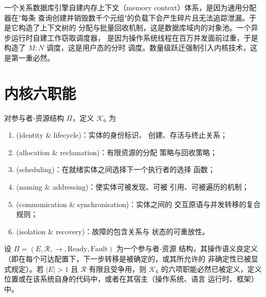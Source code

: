 \begin{example}\label{ex:pg-memctx}
一个关系数据库引擎自建内存上下文（memory context）体系，是因为通用分配器在"每条
查询创建并销毁数千个元组"的负载下会产生碎片且无法追踪泄漏。于是它构造了上下文树的
分配与批量回收机制，这是数据库域内的对象池。一个异步运行时自建工作窃取调度器，
是因为操作系统线程在百万并发面前过重，于是构造了 $M{:}N$ 调度，这是用户态的分时
调度。数量级跃迁强制引入内核技术，这是第一重必然。
\end{example}

\section{内核六职能}\label{sec:six}

\begin{definition}[内核六职能]\label{def:six}
对参与者-资源结构 $\Pi$，定义 $\mathcal{K}_6$ 为
\begin{enumerate}[label=(F\arabic*)]
\item {} \textnormal{(identity \& lifecycle)}：实体的身份标识、
      创建、存活与终止关系；
\item {} \textnormal{(allocation \& reclamation)}：有限资源的分配
      策略与回收策略；
\item {} \textnormal{(scheduling)}：在就绪实体之间选择下一个执行者的选择
      函数；
\item {} \textnormal{(naming \& addressing)}：使实体可被发现、可被
      引用、可被遍历的机制；
\item {} \textnormal{(communication \& synchronisation)}：实体之间的
      交互原语与并发转移的复合规则；
\item {} \textnormal{(isolation \& recovery)}：故障的包含关系与
      状态的可重放性。
\end{enumerate}
\end{definition}

\begin{theorem}[六职能的条件必然性]\label{th:six}
设 $\Pi = (E, \mathcal{R}, \to, \mathrm{Ready}, \mathrm{Fault})$ 为一个参与者-资源
结构，其操作语义良定义（即在每个可达配置下，下一步转移是被确定的，或其所允许的
非确定性已被显式规定）。若 $|E| > 1$ 且 $\mathcal{R}$ 有限且受争用，则 $\mathcal{K}_6$
的六项职能必然已被定义，定义位置或在该系统自身的代码中，或者在其宿主（操作系统、语言
运行时、框架）中。
\end{theorem}

